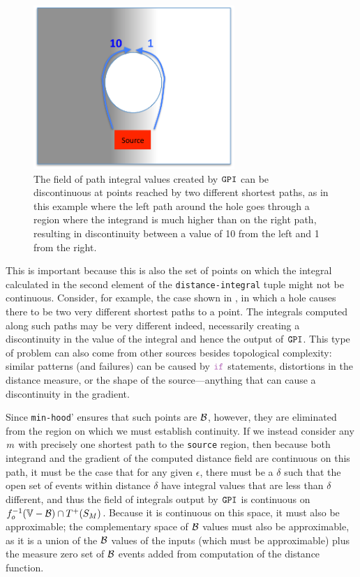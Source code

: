 \documentclass[12pt,a4paper,twoside,openright]{book}
\begin{document}
\begin{appendices}
  \begin{figure}
    \centering
    \includegraphics[width=3in]{img/holes.pdf}
    \caption[Discontinuous field path integral created by $\OneOp$]{The field of path integral values created by $\OneOp$ can be discontinuous at points reached by two different shortest paths, as in this example where the left path around the hole goes through a region where the integrand is much higher than on the right path, resulting in discontinuity between a value of 10 from the left and 1 from the right.}
    \label{f:integralfail}
  \end{figure}
  
  This is important because this is also the set of points on which the integral calculated in the second element of the {\tt distance-integral} tuple might not be continuous.
  Consider, for example, the case shown in , in which a hole causes there to be two very different shortest paths to a point.
  The integrals computed along such paths may be very different indeed, necessarily creating a discontinuity in the value of the integral and hence the output of $\OneOp$.
  This type of problem can also come from other sources besides topological complexity: similar patterns (and failures) can be caused by $\ifN$ statements, distortions in the distance measure, or the shape of the source---anything that can cause a discontinuity in the gradient.

  Since {\tt min-hood}' ensures that such points are $\mathcal{B}$, however, they are eliminated from the region on which we must establish continuity.
  If we instead consider any $m$ with precisely one shortest path to the {\tt source} region, then because both integrand and the gradient of the computed distance field are continuous on this path, it must be the case that for any given $\epsilon$, there must be a $\delta$ such that the open set of events within distance $\delta$ have integral values that are less than $\delta$ different, and thus the field of integrals output by $\OneOp$ is continuous on $\validdomain{\field_o} \cap \futureof{\sectionof{\manifold}}$.
  Because it is continuous on this space, it must also be approximable; the complementary space of $\mathcal{B}$ values must also be approximable, as it is a union of the $\mathcal{B}$ values of the inputs (which must be approximable) plus the measure zero set of $\mathcal{B}$ events added from computation of the distance function.


\end{appendices}
\end{document}
